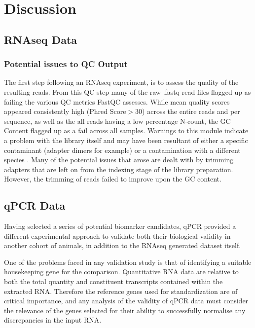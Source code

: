 \section{Discussion}

\subsection{RNAseq Data}
\subsubsection{Potential issues to QC Output}

The first step following an RNAseq experiment, is to assess the quality of the resulting reads. From this QC step many of the raw .fastq read files flagged up as failing the various QC metrics FastQC assesses. While mean quality scores appeared consistently high (Phred Score$>$30) across the entire reads and per sequence, as well as the all reads having a low percentage N-count, the GC Content flagged up as a fail across all samples. Warnings to this module indicate a problem with the library itself and may have been resultant of either a specific contaminant (adapter dimers for example) or a contamination with a different species \cite{BabrahamBioinformatics}. Many of the potential issues that arose are dealt with by trimming adapters that are left on from the indexing stage of the library preparation. However, the trimming of reads failed to improve upon the GC content. 

\subsection{qPCR Data}
Having selected a series of potential biomarker candidates, qPCR provided a different experimental approach to validate both their biological validity in another cohort of animals, in addition to the RNAseq generated dataset itself. 

One of the problems faced in any validation study is that of identifying a suitable housekeeping gene for the comparison. Quantitative RNA data are relative to both the total quantity and constituent transcripts contained within the extracted RNA. Therefore the reference genes used for standardization are of critical importance, and any analysis of the validity of qPCR data must consider the relevance of the genes selected for their ability to successfully normalise any discrepancies in the input RNA. 

